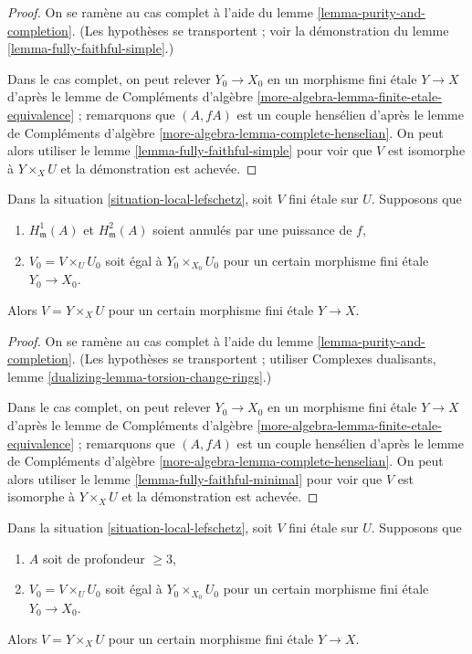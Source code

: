 \begin{proof}
On se ramène au cas complet à l'aide du lemme \ref{lemma-purity-and-completion}.
(Les hypothèses se transportent ; voir la démonstration du
lemme \ref{lemma-fully-faithful-simple}.)

\medskip\noindent
Dans le cas complet, on peut relever $Y_0 \to X_0$ en un morphisme
fini étale $Y \to X$ d'après le
lemme de Compléments d'algèbre \ref{more-algebra-lemma-finite-etale-equivalence} ;
remarquons que $(A, fA)$ est un couple hensélien d'après le
lemme de Compléments d'algèbre \ref{more-algebra-lemma-complete-henselian}.
On peut alors utiliser le lemme \ref{lemma-fully-faithful-simple}
pour voir que $V$ est isomorphe à $Y \times_X U$ et
la démonstration est achevée.
\end{proof}

\begin{lemma}
\label{lemma-lift-purity-general}
Dans la situation \ref{situation-local-lefschetz},
soit $V$ fini étale sur $U$. Supposons que
\begin{enumerate}
\item $H^1_\mathfrak m(A)$ et $H^2_\mathfrak m(A)$
soient annulés par une puissance de $f$,
\item $V_0 = V \times_U U_0$ soit égal à $Y_0 \times_{X_0} U_0$
pour un certain morphisme fini étale $Y_0 \to X_0$.
\end{enumerate}
Alors $V = Y \times_X U$ pour un certain morphisme fini étale $Y \to X$.
\end{lemma}

\begin{proof}
On se ramène au cas complet à l'aide du lemme \ref{lemma-purity-and-completion}.
(Les hypothèses se transportent ; utiliser Complexes dualisants, lemme
\ref{dualizing-lemma-torsion-change-rings}.)

\medskip\noindent
Dans le cas complet, on peut relever $Y_0 \to X_0$ en un morphisme
fini étale $Y \to X$ d'après le
lemme de Compléments d'algèbre \ref{more-algebra-lemma-finite-etale-equivalence} ;
remarquons que $(A, fA)$ est un couple hensélien d'après le
lemme de Compléments d'algèbre \ref{more-algebra-lemma-complete-henselian}.
On peut alors utiliser le lemme \ref{lemma-fully-faithful-minimal}
pour voir que $V$ est isomorphe à $Y \times_X U$ et
la démonstration est achevée.
\end{proof}

\begin{lemma}
\label{lemma-lift-purity}
Dans la situation \ref{situation-local-lefschetz},
soit $V$ fini étale sur $U$. Supposons que
\begin{enumerate}
\item $A$ soit de profondeur $\geq 3$,
\item $V_0 = V \times_U U_0$ soit égal à $Y_0 \times_{X_0} U_0$
pour un certain morphisme fini étale $Y_0 \to X_0$.
\end{enumerate}
Alors $V = Y \times_X U$ pour un certain morphisme fini étale $Y \to X$.
\end{lemma}

